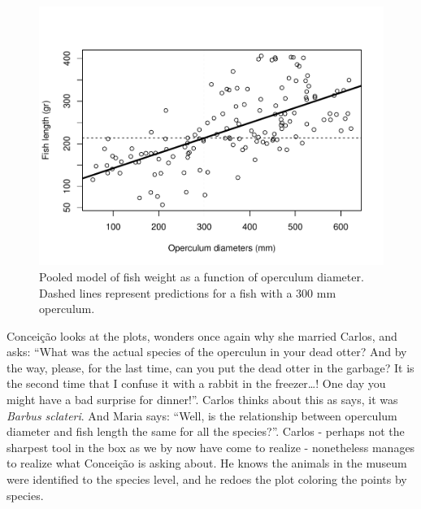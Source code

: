 \documentclass[
]{book}
\newenvironment{Shaded}{\begin{snugshade}}{\end{snugshade}}
\newcommand{\CommentTok}[1]{\textcolor[rgb]{0.56,0.35,0.01}{\textit{#1}}}
\newcommand{\DataTypeTok}[1]{\textcolor[rgb]{0.13,0.29,0.53}{#1}}
\newcommand{\DecValTok}[1]{\textcolor[rgb]{0.00,0.00,0.81}{#1}}
\newcommand{\KeywordTok}[1]{\textcolor[rgb]{0.13,0.29,0.53}{\textbf{#1}}}
\newcommand{\NormalTok}[1]{#1}
\newcommand{\OperatorTok}[1]{\textcolor[rgb]{0.81,0.36,0.00}{\textbf{#1}}}
\newcommand{\StringTok}[1]{\textcolor[rgb]{0.31,0.60,0.02}{#1}}
\begin{document}
\begin{Shaded}
\end{Shaded}

\begin{figure}

{\centering \includegraphics[width=0.8\linewidth]{ECOMODbook_files/figure-latex/wod-1} 

}

\caption{Pooled model of fish weight as a function of operculum diameter. Dashed lines represent predictions for a fish with a 300 mm operculum.}\label{fig:wod}
\end{figure}

Conceição looks at the plots, wonders once again why she married Carlos, and asks: ``What was the actual species of the operculun in your dead otter? And by the way, please, for the last time, can you put the dead otter in the garbage? It is the second time that I confuse it with a rabbit in the freezer\ldots! One day you might have a bad surprise for dinner!''. Carlos thinks about this as says, it was \emph{Barbus sclateri}. And Maria says: ``Well, is the relationship between operculum diameter and fish length the same for all the species?''. Carlos - perhaps not the sharpest tool in the box as we by now have come to realize - nonetheless manages to realize what Conceição is asking about. He knows the animals in the museum were identified to the species level, and he redoes the plot coloring the points by species.
\end{document}
